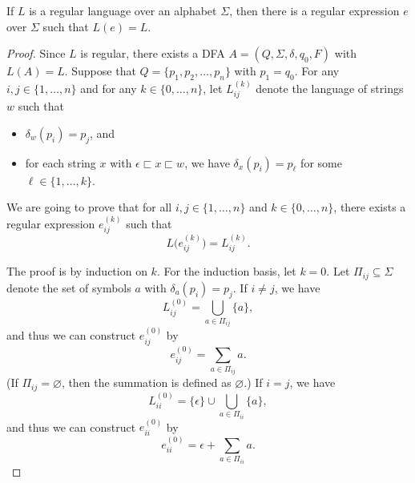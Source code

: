 \begin{lemma}
  \label{thm:regular-to-regex}
  If $L$ is a regular language over an alphabet $\Sigma$, then there is a
  regular expression $e$ over $\Sigma$ such that $L(e) = L$.
\end{lemma}
\begin{proof}
  Since $L$ is regular, there exists a DFA $A = (Q, \Sigma, \delta, q_0, F)$
  with $L(A) = L$.
  Suppose that $Q = \{p_1, p_2, \dots, p_n\}$ with $p_1 = q_0$.
  For any $i, j \in \{1, \dots, n\}$ and for any $k \in \{0, \dots, n\}$,
  let $L_{ij}^{(k)}$ denote the language of strings $w$ such that 
  \begin{itemize}
    \item $\delta_w(p_i) = p_j$, and
    \item for each string $x$ with $\epsilon \sqsubset x \sqsubset w$, we have
    $\delta_x(p_i) = p_\ell$ for some $\ell \in \{1, \dots, k\}$.
  \end{itemize}
  We are going to prove that for all $i, j \in \{1, \dots, n\}$ and
  $k \in \{0, \dots, n\}$, there exists a regular expression $e_{ij}^{(k)}$
  such that
  \begin{equation*}
    L\bigl(e_{ij}^{(k)}\bigr) = L_{ij}^{(k)}.
  \end{equation*}

  The proof is by induction on $k$. For the induction basis, let $k = 0$.
  Let $\Pi_{ij} \subseteq \Sigma$ denote the set of symbols $a$ with
  $\delta_a(p_i) = p_j$.
  If $i \neq j$, we have
  \begin{equation*}
    L_{ij}^{(0)} = \bigcup_{a \in \Pi_{ij}} \{a\},
  \end{equation*}
  and thus we can construct $e_{ij}^{(0)}$ by
  \begin{equation*}
    e_{ij}^{(0)} = \sum_{a \in \Pi_{ij}} a.
  \end{equation*}
  (If $\Pi_{ij} = \varnothing$, then the summation is defined as
  $\varnothing$.)
  If $i = j$, we have
  \begin{equation*}
    L_{ii}^{(0)} = \{\epsilon\} \cup \bigcup_{a \in \Pi_{ii}} \{a\},
  \end{equation*}
  and thus we can construct $e_{ii}^{(0)}$ by
  \begin{equation*}
    e_{ii}^{(0)} = \epsilon + \sum_{a \in \Pi_{ii}} a.
  \end{equation*}


\end{proof}
